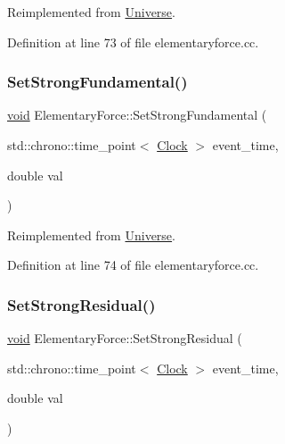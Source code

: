 Reimplemented from \mbox{\hyperlink{class_universe_a5946c8f3d4cda305f3ecd10df21a2f94}{Universe}}.



Definition at line 73 of file elementaryforce.\+cc.

\mbox{\label{class_elementary_force_afb00e9a10ec33eeb1daefce39b0468b7}} 
\subsubsection{\texorpdfstring{Set\+Strong\+Fundamental()}{SetStrongFundamental()}}
{\footnotesize\ttfamily \mbox{\hyperlink{glad_8h_a950fc91edb4504f62f1c577bf4727c29}{void}} Elementary\+Force\+::\+Set\+Strong\+Fundamental (\begin{DoxyParamCaption}\item[{std\+::chrono\+::time\+\_\+point$<$ \mbox{\hyperlink{universe_8h_a0ef8d951d1ca5ab3cfaf7ab4c7a6fd80}{Clock}} $>$}]{event\+\_\+time,  }\item[{double}]{val }\end{DoxyParamCaption})\hspace{0.3cm}{\ttfamily [virtual]}}



Reimplemented from \mbox{\hyperlink{class_universe_aafec97a231126b71c73ac1258609a284}{Universe}}.



Definition at line 74 of file elementaryforce.\+cc.

\mbox{\label{class_elementary_force_ac25021d38c1d54bf711096ab37a461f6}} 
\subsubsection{\texorpdfstring{Set\+Strong\+Residual()}{SetStrongResidual()}}
{\footnotesize\ttfamily \mbox{\hyperlink{glad_8h_a950fc91edb4504f62f1c577bf4727c29}{void}} Elementary\+Force\+::\+Set\+Strong\+Residual (\begin{DoxyParamCaption}\item[{std\+::chrono\+::time\+\_\+point$<$ \mbox{\hyperlink{universe_8h_a0ef8d951d1ca5ab3cfaf7ab4c7a6fd80}{Clock}} $>$}]{event\+\_\+time,  }\item[{double}]{val }\end{DoxyParamCaption})\hspace{0.3cm}{\ttfamily [virtual]}}



